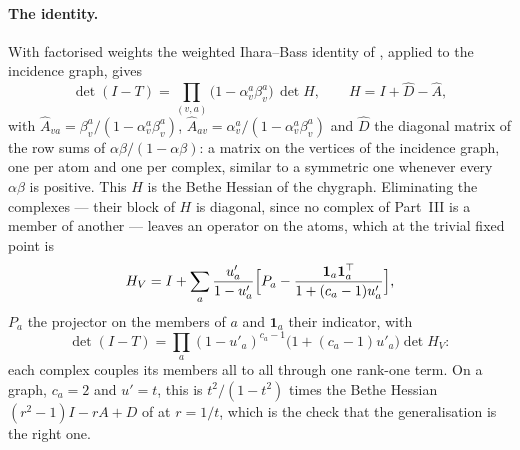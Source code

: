\paragraph{The identity.} With factorised weights the weighted
Ihara--Bass identity of \citet{watanabe2009}, applied to the incidence
graph, gives
\begin{equation}
  \det(I-T)
  =\prod_{(v,a)}\bigl(1-\alpha^{a}_{v}\beta^{a}_{v}\bigr)\,\det H,
  \qquad
  H=I+\hat D-\hat A,
  \label{eq:mb-iharabass}
\end{equation}
with $\hat A_{va}=\beta^{a}_{v}/(1-\alpha^{a}_{v}\beta^{a}_{v})$,
$\hat A_{av}=\alpha^{a}_{v}/(1-\alpha^{a}_{v}\beta^{a}_{v})$ and $\hat D$
the diagonal matrix of the row sums of $\alpha\beta/(1-\alpha\beta)$: a
matrix on the vertices of the incidence graph, one per atom and one per
complex, similar to a symmetric one whenever every $\alpha\beta$ is
positive. This $H$ is the Bethe Hessian of the chygraph. Eliminating the
complexes --- their block of $H$ is diagonal, since no complex of Part~III
is a member of another --- leaves an operator on the atoms, which at the
trivial fixed point is
\begin{equation}
  H_{V}=I+\sum_{a}\frac{u'_{a}}{1-u'_{a}}
  \Bigl[P_{a}-\frac{\mathbf 1_{a}\mathbf 1_{a}^{\top}}{1+(c_{a}-1)u'_{a}}\Bigr],
  \label{eq:mb-hessian}
\end{equation}
$P_{a}$ the projector on the members of $a$ and $\mathbf 1_{a}$ their
indicator, with
\[
  \det(I-T)=\prod_{a}(1-u'_{a})^{c_{a}-1}\bigl(1+(c_{a}-1)u'_{a}\bigr)
  \det H_{V}:
\]
each complex couples its members all to all through one rank-one term. On a graph, $c_{a}=2$ and $u'=t$, this is $t^{2}/(1-t^{2})$
times the Bethe Hessian $(r^{2}-1)I-rA+D$ of \citet{saade2014} at $r=1/t$,
which is the check that the generalisation is the right one.

